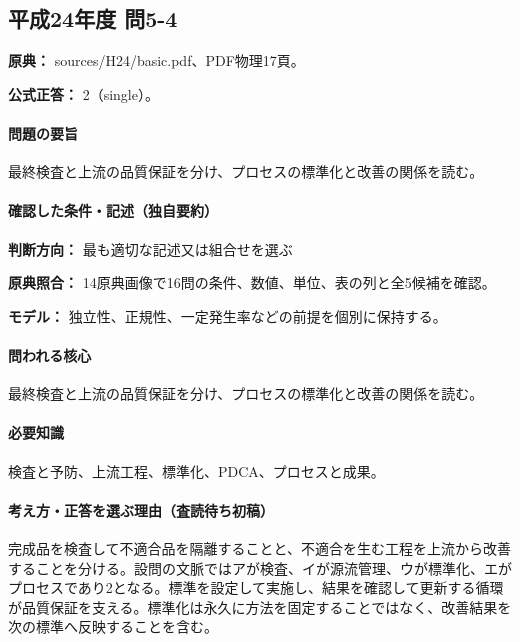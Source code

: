 \subsection{平成24年度 問5-4}
\label{q:h24-reg-basic-5-4}

\noindent\textbf{原典：} sources/H24/basic.pdf、PDF物理17頁。

\textbf{公式正答：} 2（single）。

\paragraph{問題の要旨} 最終検査と上流の品質保証を分け、プロセスの標準化と改善の関係を読む。

\paragraph{確認した条件・記述（独自要約）}\mbox{}\par

\noindent\textbf{判断方向：} 最も適切な記述又は組合せを選ぶ\par

\noindent\textbf{原典照合：} 14原典画像で16問の条件、数値、単位、表の列と全5候補を確認。\par

\noindent\textbf{モデル：} 独立性、正規性、一定発生率などの前提を個別に保持する。\par

\paragraph{問われる核心} 最終検査と上流の品質保証を分け、プロセスの標準化と改善の関係を読む。

\paragraph{必要知識} 検査と予防、上流工程、標準化、PDCA、プロセスと成果。

\paragraph{考え方・正答を選ぶ理由（査読待ち初稿）} 完成品を検査して不適合品を隔離することと、不適合を生む工程を上流から改善することを分ける。設問の文脈ではアが検査、イが源流管理、ウが標準化、エがプロセスであり2となる。標準を設定して実施し、結果を確認して更新する循環が品質保証を支える。標準化は永久に方法を固定することではなく、改善結果を次の標準へ反映することを含む。

